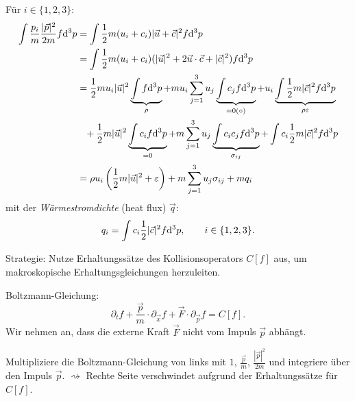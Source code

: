 Für $i \in \{1, 2, 3\}$:
\begin{align*}
  \int \frac{p_i}{m} \frac{|\vec{p}|^2}{2m} f \mathrm{d}^3 p
  &= \int \frac{1}{2} m (u_i + c_i) |\vec{u} + \vec{c}|^2 f \mathrm{d}^3 p \\
  &= \int \frac{1}{2} m (u_i + c_i) ( |\vec{u}|^2
    + 2 \vec{u} \cdot \vec{c} + |\vec{c}|^2) f \mathrm{d}^3 p \\
  &= \frac{1}{2} m u_i |\vec{u}|^2
    \underbrace{\int f \mathrm{d}^3 p}_{\rho}
    + m u_i \sum_{j=1}^3 u_j
    \underbrace{\int c_j f \mathrm{d}^3 p}_{= 0 (\circ)}
    + u_i \underbrace{\int \frac{1}{2} m |\vec{c}|^2 f \mathrm{d}^3 p}_{\rho \varepsilon} \\
  &\phantom{=} + \frac{1}{2} m |\vec{u}|^2 \underbrace{\int c_i f \mathrm{d}^3 p}_{=0}
    + m \sum_{j=1}^3 u_j
    \underbrace{\int c_i c_j f \mathrm{d}^3 p}_{\sigma_{ij}}
    + \int c_i \frac{1}{2} m |\vec{c}|^2 f \mathrm{d}^3 p \\
  &= \rho u_i \left( \frac{1}{2} m |\vec{u}|^2 + \varepsilon \right)
    + m \sum_{j=1}^3 u_j \sigma_{ij} + m q_i
\end{align*}
mit der \emph{Wärmestromdichte} (heat flux) $\vec{q}$:
\[ q_i = \int c_i \frac{1}{2} |\vec{c}|^2 f \mathrm{d}^3 p, \qquad i \in \{ 1, 2, 3
  \}. \]

Strategie: Nutze Erhaltungssätze des Kollisionsoperators $C[f]$ aus, um
makroskopische Erhaltungsgleichungen herzuleiten.

Boltzmann-Gleichung:
\[ \partial_t f + \frac{\vec{p}}{m} \cdot \partial_{\vec{x}} f
  + \vec{F} \cdot \partial_{\vec{p}} f = C[f]. \]
Wir nehmen an, dass die externe Kraft $\vec{F}$ nicht vom Impuls $\vec{p}$
abhängt.

Multipliziere die Boltzmann-Gleichung von links mit $1$, $\frac{\vec{p}}{m}$,
$\frac{|\vec{p}|^2}{2m}$ und integriere über den Impuls $\vec{p}$.
$\rightsquigarrow$ Rechte Seite verschwindet aufgrund der Erhaltungssätze für
$C[f]$.

